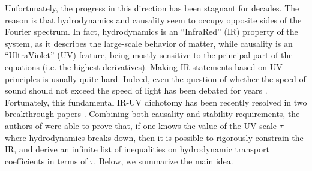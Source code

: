 \documentclass[a4paper, amsfonts, amssymb, amsmath, reprint, showkeys, nofootinbib, twoside,notitlepage,onecolumn]{revtex4-2}
\theoremstyle{definition}
\theoremstyle{theorem}
\theoremstyle{corollary}
\begin{document}
Unfortunately, the progress in this direction has been stagnant for decades. The reason is that hydrodynamics and causality seem to occupy opposite sides of the Fourier spectrum. In fact, hydrodynamics is an ``InfraRed'' (IR) property of the system, as it describes the large-scale behavior of matter, while causality is an ``UltraViolet'' (UV) feature, being mostly sensitive to the principal part of the equations (i.e. the highest derivatives). Making IR statements based on UV principles is usually quite hard. Indeed, even the question of whether the speed of sound should not exceed the speed of light has been debated for years \cite{Bludman1968,Susskind1969,Israel_2009_inbook,Camelio2022}. Fortunately, this fundamental IR-UV dichotomy has been recently resolved in two breakthrough papers \cite{HellerBounds2023,HellerHydroHedron2023jtd}. Combining both causality and stability requirements, the authors of \cite{HellerBounds2023,HellerHydroHedron2023jtd} were able to prove that, if one knows the value of the UV scale $\tau$ where hydrodynamics breaks down, then it is possible to rigorously constrain the IR, and derive an infinite list of inequalities on hydrodynamic transport coefficients in terms of $\tau$. Below, we summarize the main idea. 
\end{document}
